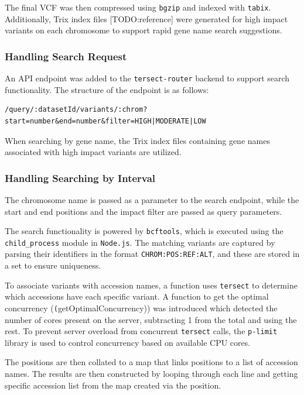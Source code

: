 \documentclass[12pt]{article}
\begin{document}
The final VCF was then compressed using \texttt{bgzip} and indexed with \texttt{tabix}. Additionally, Trix index files [TODO:reference] were generated for high impact variants on each chromosome to support rapid gene name search suggestions.

\subsubsection{Handling Search Request}

An API endpoint was added to the \texttt{tersect-router} backend to support search functionality. The structure of the endpoint is as follows:

\begin{verbatim}
/query/:datasetId/variants/:chrom?start=number&end=number&filter=HIGH|MODERATE|LOW
\end{verbatim}

When searching by gene name, the Trix index files containing gene names associated with high impact variants are utilized.

\subsubsection{Handling Searching by Interval}

The chromosome name is passed as a parameter to the search endpoint, while the start and end positions and the impact filter are passed as query parameters.

The search functionality is powered by \texttt{bcftools}, which is executed using the \texttt{child\_process} module in \texttt{Node.js}. The matching variants are captured by parsing their identifiers in the format \texttt{CHROM:POS:REF:ALT}, and these are stored in a set to ensure uniqueness. 

To associate variants with accession names, a function uses \texttt{tersect} to determine which accessions have each specific variant. A function to get the optimal concurrency (\texttt(getOptimalConcurrency)) was introduced which detected the number of cores present on the server, subtracting 1 from the total and using the rest. To prevent server overload from concurrent \texttt{tersect} calls, the \texttt{p-limit} library is used to control concurrency based on available CPU cores.

The positions are then collated to a map that links positions to a list of accession names. The results are then constructed by looping through each line and getting specific accession list from the map created via the position.
\end{document}
